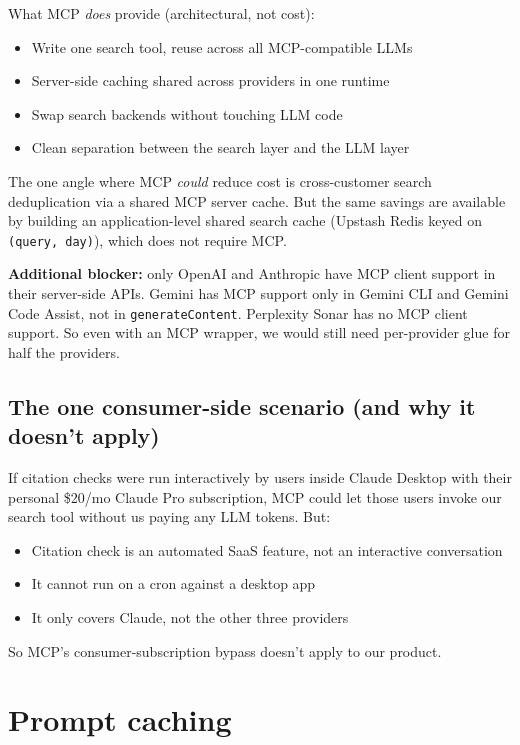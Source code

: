\documentclass[11pt,letterpaper]{article}
\begin{document}
What MCP \textit{does} provide (architectural, not cost):

\begin{itemize}[nosep]
  \item Write one search tool, reuse across all MCP-compatible LLMs
  \item Server-side caching shared across providers in one runtime
  \item Swap search backends without touching LLM code
  \item Clean separation between the search layer and the LLM layer
\end{itemize}

The one angle where MCP \textit{could} reduce cost is cross-customer search
deduplication via a shared MCP server cache. But the same savings are
available by building an application-level shared search cache (Upstash
Redis keyed on \texttt{(query, day)}), which does not require MCP.

\textbf{Additional blocker:} only OpenAI and Anthropic have MCP client
support in their server-side APIs. Gemini has MCP support only in Gemini
CLI and Gemini Code Assist, not in \texttt{generateContent}. Perplexity
Sonar has no MCP client support. So even with an MCP wrapper, we would
still need per-provider glue for half the providers.

\subsection{The one consumer-side scenario (and why it doesn't apply)}

If citation checks were run interactively by users inside Claude Desktop
with their personal \$20/mo Claude Pro subscription, MCP could let those
users invoke our search tool without us paying any LLM tokens. But:

\begin{itemize}[nosep]
  \item Citation check is an automated SaaS feature, not an interactive conversation
  \item It cannot run on a cron against a desktop app
  \item It only covers Claude, not the other three providers
\end{itemize}

So MCP's consumer-subscription bypass doesn't apply to our product.

\section{Prompt caching}
\end{document}
